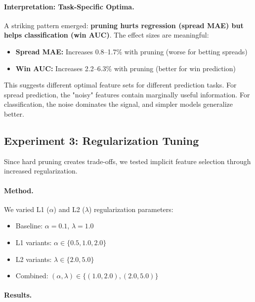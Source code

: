 \paragraph{Interpretation: Task-Specific Optima.}
A striking pattern emerged: \textbf{pruning hurts regression (spread MAE) but helps classification (win AUC)}. The effect sizes are meaningful:

\begin{itemize}[itemsep=2pt,parsep=0pt]
    \item \textbf{Spread MAE:} Increases 0.8--1.7\% with pruning (worse for betting spreads)
    \item \textbf{Win AUC:} Increases 2.2--6.3\% with pruning (better for win prediction)
\end{itemize}

This suggests different optimal feature sets for different prediction tasks. For spread prediction, the "noisy" features contain marginally useful information. For classification, the noise dominates the signal, and simpler models generalize better.

\subsection{Experiment 3: Regularization Tuning}

Since hard pruning creates trade-offs, we tested implicit feature selection through increased regularization.

\paragraph{Method.}
We varied L1 ($\alpha$) and L2 ($\lambda$) regularization parameters:
\begin{itemize}[itemsep=2pt,parsep=0pt]
    \item Baseline: $\alpha = 0.1$, $\lambda = 1.0$
    \item L1 variants: $\alpha \in \{0.5, 1.0, 2.0\}$
    \item L2 variants: $\lambda \in \{2.0, 5.0\}$
    \item Combined: $(\alpha, \lambda) \in \{(1.0, 2.0), (2.0, 5.0)\}$
\end{itemize}

\paragraph{Results.}

